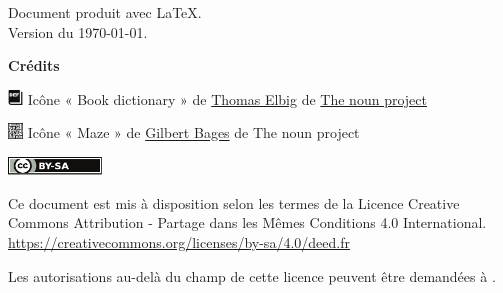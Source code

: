 
\thispagestyle{empty}

\vfill

\bigskip
\noindent
Document produit avec \LaTeX.
\\Version du \today.

\vfill

\textbf{Crédits}

\includegraphics[width=4mm]{icon/definition}
Icône « Book dictionary » de 
\href{https://thenounproject.com/dergraph}{Thomas Elbig} de 
\href{https://thenounproject.com}{The noun project}

\includegraphics[width=4mm]{icon/reflexion}
Icône « Maze » de 
\href{https://thenounproject.com/gilbertbages}{Gilbert Bages} de 
The noun project


\vspace{1cm}
\includegraphics[width=25mm]{images/cc-by-sa}

Ce document est mis à disposition selon les termes de la Licence Creative
\\Commons Attribution - Partage dans les Mêmes Conditions 4.0 International.
\\\url{https://creativecommons.org/licenses/by-sa/4.0/deed.fr}

Les autorisations au-delà du champ de cette licence
peuvent être demandées à \texttt{\contact}.


